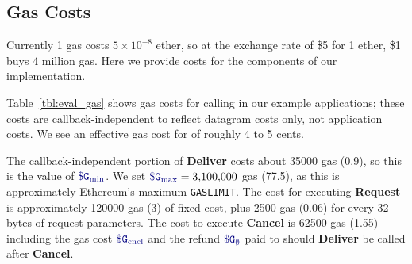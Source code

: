 \subsection{Gas Costs}
Currently 1 gas costs $5 \times10^{-8}$ ether, so at the exchange rate of \$5 for 1 ether, \$1 buys 4 million gas.
Here we provide costs for the components of our implementation.

Table~\ref{tbl:eval_gas} shows gas costs for calling \tc in our example applications; these costs are callback-independent to reflect datagram costs only, not application costs. We see an effective gas cost for \tc of roughly 4 to 5 cents.

The callback-independent portion of {\bf Deliver} costs about \num[group-separator={,}]{35000} gas (0.9\textcent), so this is the value of $\constgasmin$.
We set $\constgasmax = \num[group-separator={,}]{3100000}$ gas (77.5\textcent), as this is approximately Ethereum's maximum {\tt GASLIMIT}.
The cost for executing {\bf Request} is approximately \num[group-separator={,}]{120000} gas (3\textcent) of fixed cost, 
plus \num[group-separator={,}]{2500} gas (0.06\textcent) for every 32 bytes of request parameters.
The cost to execute {\bf Cancel} is 62500 gas (1.55\textcent)
including the gas cost $\constgasinvokecancel$ and the refund $\constgascancel$ paid to \tc should {\bf Deliver} be called after {\bf Cancel}.





